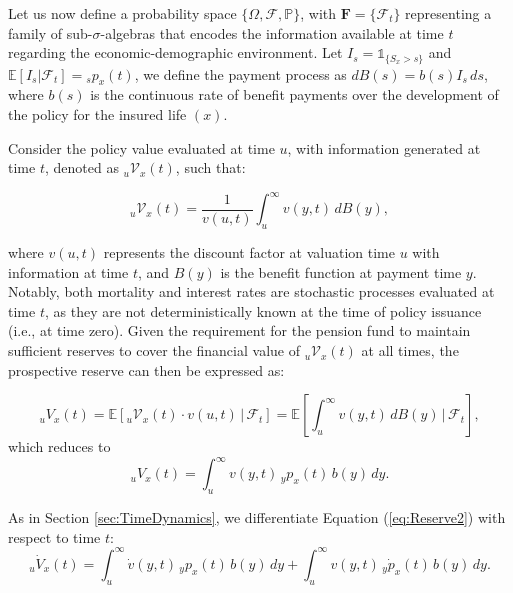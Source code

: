 \documentclass[12pt]{article}
\begin{document}
Let us now define a probability space \( \{\Omega, \mathcal{F}, \mathbb{P}\} \), with \(\textbf{F} = \{\mathcal{F}_t\}\) representing a family of sub-\(\sigma\)-algebras that encodes the information available at time \( t \) regarding the economic-demographic environment. Let \( I_{s} = \mathds{1}_{\{S_x > s\}} \) and \( \mathbb{E}[I_{s} | \mathcal{F}_t] = {}_s p_x(t) \), we define the payment process as \( dB(s) = b(s) I_{s} \, ds \), where \( b(s) \) is the continuous rate of benefit payments over the development of the policy for the insured life \( (x) \).


Consider the policy value evaluated at time \( u \), with information generated at time \( t \), denoted as \({}_u\mathcal{V}_x(t)\), such that:

\[
{}_u\mathcal{V}_x(t) = \frac{1}{v(u, t)} \int_u^{\infty} v(y, t) \, dB(y),
\]

where \( v(u, t) \) represents the discount factor at valuation time \( u \) with information at time \( t \), and \( B(y) \) is the benefit function at payment time \( y \). Notably, both mortality and interest rates are stochastic processes evaluated at time \( t \), as they are not deterministically known at the time of policy issuance (i.e., at time zero). Given the requirement for the pension fund to maintain sufficient reserves to cover the financial value of \({}_u\mathcal{V}_x(t)\) at all times, the prospective reserve can then be expressed as:

\begin{equation}\label{eq:Reserve1}
	{}_uV_x(t) = \mathbb{E}[{}_u\mathcal{V}_x(t) \cdot v(u,t) \,|\, \mathcal{F}_t] = \mathbb{E} \left[ \int_u^\infty v(y,t) \, dB(y) \,|\, \mathcal{F}_t \right],
\end{equation}
which reduces to
\begin{equation}\label{eq:Reserve2}
	{}_uV_x(t) = \int_u^\infty v(y,t) \, {}_yp_x(t) \, b(y) \, dy.
\end{equation}

As in Section \ref{sec:TimeDynamics}, we differentiate Equation (\ref{eq:Reserve2}) with respect to time $t$:
\begin{equation}\label{eq:DifferentiateReserveT}
	{}_u\dot{V}_x(t) = \int_u^\infty \dot{v}(y,t) \, {}_yp_x(t) \, b(y) \, dy + \int_u^\infty v(y,t) \, {}_y\dot{p}_x(t) \, b(y) \, dy.
\end{equation}
\end{document}
